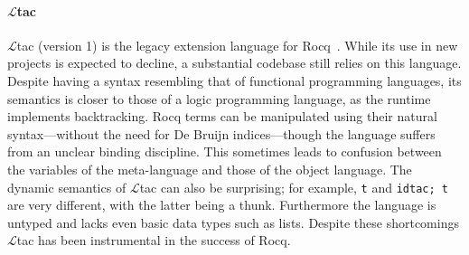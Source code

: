 \documentclass[sigplan,natbib=false]{acmart}
\begin{document}
\paragraph{
$\mathcal{L}$tac} $\mathcal{L}$tac (version 1) is the legacy extension language for
Rocq~\cite{10.5555/1765236.1765246}. While its use in new projects is expected
to decline, a substantial codebase still relies on this language. Despite
having a syntax resembling that of functional programming languages, its
semantics is closer to those of a logic programming language, as the runtime
implements backtracking. Rocq terms can be manipulated using their natural
syntax—without the need for De Bruijn indices—though the language suffers from
an unclear binding discipline. This sometimes leads to confusion between the
variables of the meta-language and those of the object language. The dynamic
semantics of $\mathcal{L}$tac can also be surprising; for example, \texttt{t} and
\texttt{idtac; t} are very different, with the latter being a thunk.
Furthermore the language is untyped and lacks even basic data types such as lists.
Despite these shortcomings $\mathcal{L}$tac has been instrumental in the success of Rocq.
\end{document}
